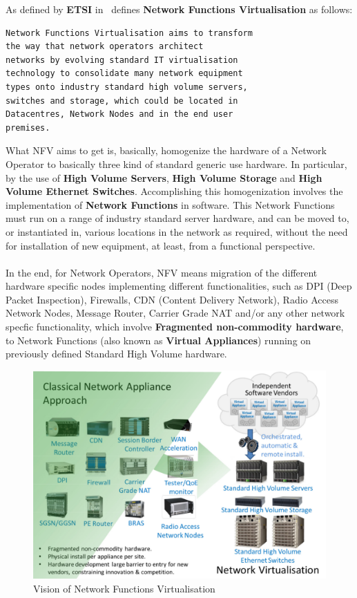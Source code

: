 \documentclass[a4paper, 12pt]{book}
\begin{document}
As defined by \textbf{ETSI} in~\cite{ETSINFVDefinition} defines \textbf{Network Functions Virtualisation} as follows:
\begin{verbatim}
Network Functions Virtualisation aims to transform
the way that network operators architect
networks by evolving standard IT virtualisation
technology to consolidate many network equipment
types onto industry standard high volume servers,
switches and storage, which could be located in
Datacentres, Network Nodes and in the end user
premises.
\end{verbatim}
What NFV aims to get is, basically, homogenize the hardware of a Network Operator to basically three kind of standard generic use hardware. In particular, by the use of \textbf{High Volume Servers}, \textbf{High Volume Storage} and \textbf{High Volume Ethernet Switches}. Accomplishing this homogenization involves the implementation of \textbf{Network Functions} in software. This Network Functions must run on a range of industry standard server hardware, and can be moved to, or instantiated in, various locations in the network as required, without the need for installation of new equipment, at least, from a functional perspective.\\
\\
In the end, for Network Operators, NFV means migration of the different hardware specific nodes implementing different functionalities, such as DPI (Deep Packet Inspection), Firewalls, CDN (Content Delivery Network), Radio Access Network Nodes, Message Router, Carrier Grade NAT and/or any other network specfic functionality, which involve \textbf{Fragmented non-commodity hardware}, to Network Functions (also known as \textbf{Virtual Appliances}) running on previously defined Standard High Volume hardware.

\begin{center}
 \begin{figure}[H]
 \begin{center}
   \includegraphics[width=15cm]{img/nfv-etsi-01.png}
   \caption{Vision of Network Functions Virtualisation}
   \label{fig:nfv_vision}
 \end{center}
 \end{figure}
\end{center}
\end{document}
